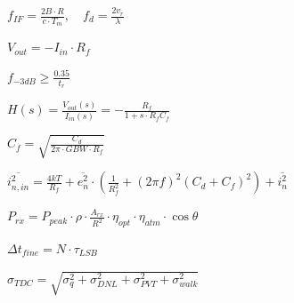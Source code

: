 \documentclass[12pt]{article}
\begin{document}
\begin{center}$f_{IF} = \frac{2B \cdot R}{c \cdot T_m},\quad f_d = \frac{2v_r}{\lambda}$\end{center}\vspace*{\fill}\newpage
\vspace*{\fill}
\begin{center}$V_{out} = -I_{in} \cdot R_f$\end{center}\vspace*{\fill}\newpage
\vspace*{\fill}
\begin{center}$f_{-3dB} \geq \frac{0.35}{t_r}$\end{center}\vspace*{\fill}\newpage
\vspace*{\fill}
\begin{center}$H(s) = \frac{V_{out}(s)}{I_{in}(s)} = -\frac{R_f}{1 + s \cdot R_f C_f}$\end{center}\vspace*{\fill}\newpage
\vspace*{\fill}
\begin{center}$C_f = \sqrt{\frac{C_d}{2\pi \cdot GBW \cdot R_f}}$\end{center}\vspace*{\fill}\newpage
\vspace*{\fill}
\begin{center}$\overline{i_{n,in}^2} = \frac{4kT}{R_f} + \overline{e_n^2} \cdot \left(\frac{1}{R_f^2} + (2\pi f)^2 (C_d + C_f)^2\right) + \overline{i_n^2}$\end{center}\vspace*{\fill}\newpage
\vspace*{\fill}
\begin{center}$P_{rx} = P_{peak} \cdot \rho \cdot \frac{A_{rx}}{R^2} \cdot \eta_{opt} \cdot \eta_{atm} \cdot \cos\theta$\end{center}\vspace*{\fill}\newpage
\vspace*{\fill}
\begin{center}$\Delta t_{fine} = N \cdot \tau_{LSB}$\end{center}\vspace*{\fill}\newpage
\vspace*{\fill}
\begin{center}$\sigma_{TDC} = \sqrt{\sigma_{q}^2 + \sigma_{DNL}^2 + \sigma_{PVT}^2 + \sigma_{walk}^2}$\end{center}\vspace*{\fill}\newpage
\end{document}
